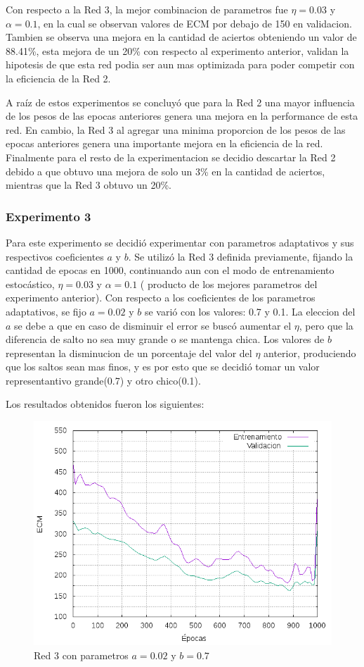 Con respecto a la Red 3, la mejor combinacion de parametros fue $\eta = 0.03$ y $\alpha = 0.1$, en la cual se observan valores de ECM por debajo de 150
en validacion. Tambien se observa una mejora en la cantidad de aciertos obteniendo un valor de 88.41\%, esta mejora de un 20\% con respecto al experimento
anterior, validan la hipotesis de que esta red podia ser aun mas optimizada para poder competir con la eficiencia de la Red 2.


A raíz de estos experimentos se concluyó que para la Red 2 una mayor influencia de los pesos de las epocas anteriores genera una mejora en la performance
de esta red. En cambio, la Red 3 al agregar una minima proporcion de los pesos de las epocas anteriores genera una importante mejora en la eficiencia
de la red.
Finalmente para el resto de la experimentacion se decidio descartar la Red 2 debido a que obtuvo una mejora de solo un 3\% en la cantidad de aciertos,
mientras que la Red 3 obtuvo un 20\%.

\subsubsection{Experimento 3}
Para este experimento se decidió experimentar con parametros adaptativos y sus respectivos coeficientes $a$ y $b$. Se utilizó la Red 3 definida
previamente, fijando la cantidad de epocas en 1000, continuando aun con el modo de entrenamiento estocástico, $\eta = 0.03$ y $\alpha = 0.1$ ( producto
de los mejores parametros del experimento anterior).
Con respecto a los coeficientes de los parametros adaptativos, se fijo $a = 0.02$ y $b$ se varió con los valores: 0.7 y 0.1. La eleccion del $a$ se debe
a que en caso de disminuir el error se buscó aumentar el $\eta$, pero que la diferencia de salto no sea muy grande o se mantenga chica. Los valores de
 $b$ representan la disminucion de un porcentaje del valor del $\eta$ anterior, produciendo que los saltos sean mas finos, y es por esto que se decidió
 tomar un valor representantivo grande(0.7) y otro chico(0.1).

Los resultados obtenidos fueron los siguientes:
\begin{figure}[H]
  \includegraphics[width=125mm]{imagenes/ej1/ex_3-1_red_11-6-6-9-1_errors.png}
  \caption{Red 3 con parametros $a = 0.02 $ y $b= 0.7$}
\end{figure}

